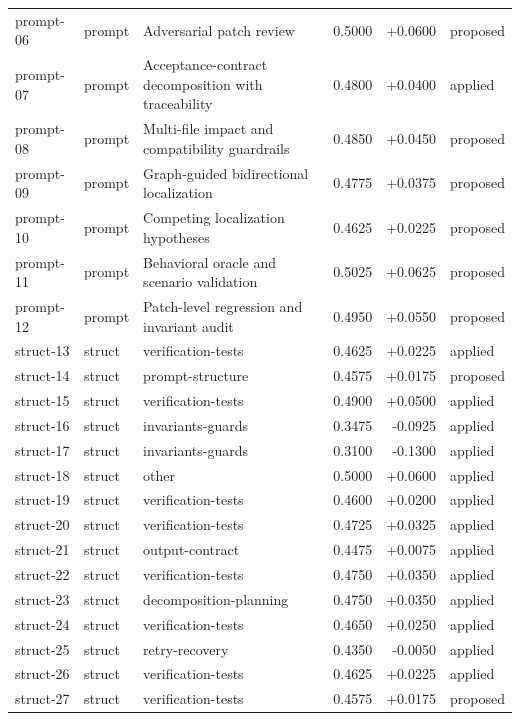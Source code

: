 \begin{center}
\begin{longtable}{llp{5.2cm}rrl}
prompt-06 & prompt & Adversarial patch review & 0.5000 & +0.0600 & proposed \\
prompt-07 & prompt & Acceptance-contract decomposition with traceability & 0.4800 & +0.0400 & applied \\
prompt-08 & prompt & Multi-file impact and compatibility guardrails & 0.4850 & +0.0450 & proposed \\
prompt-09 & prompt & Graph-guided bidirectional localization & 0.4775 & +0.0375 & proposed \\
prompt-10 & prompt & Competing localization hypotheses & 0.4625 & +0.0225 & proposed \\
prompt-11 & prompt & Behavioral oracle and scenario validation & 0.5025 & +0.0625 & proposed \\
prompt-12 & prompt & Patch-level regression and invariant audit & 0.4950 & +0.0550 & proposed \\
struct-13 & struct & verification-tests & 0.4625 & +0.0225 & applied \\
struct-14 & struct & prompt-structure & 0.4575 & +0.0175 & proposed \\
struct-15 & struct & verification-tests & 0.4900 & +0.0500 & applied \\
struct-16 & struct & invariants-guards & 0.3475 & -0.0925 & applied \\
struct-17 & struct & invariants-guards & 0.3100 & -0.1300 & applied \\
struct-18 & struct & other & 0.5000 & +0.0600 & applied \\
struct-19 & struct & verification-tests & 0.4600 & +0.0200 & applied \\
struct-20 & struct & verification-tests & 0.4725 & +0.0325 & applied \\
struct-21 & struct & output-contract & 0.4475 & +0.0075 & applied \\
struct-22 & struct & verification-tests & 0.4750 & +0.0350 & applied \\
struct-23 & struct & decomposition-planning & 0.4750 & +0.0350 & applied \\
struct-24 & struct & verification-tests & 0.4650 & +0.0250 & applied \\
struct-25 & struct & retry-recovery & 0.4350 & -0.0050 & applied \\
struct-26 & struct & verification-tests & 0.4625 & +0.0225 & applied \\
struct-27 & struct & verification-tests & 0.4575 & +0.0175 & proposed \\

\end{longtable}
\end{center}
